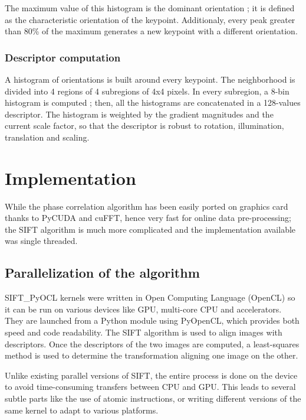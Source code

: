 \documentclass[preprint]{iucr}
\begin{document}
The maximum value of this histogram is the dominant orientation ; it is defined as the characteristic orientation of the keypoint. Additionaly, every peak greater than 80\% of the maximum generates a new keypoint with a different orientation.



\subsubsection{Descriptor computation}
A histogram of orientations is built around every keypoint. The neighborhood is divided into 4 regions of 4 subregions of 4x4 pixels. In every subregion, a 8-bin histogram is computed ; then, all the histograms are concatenated in a 128-values descriptor. The histogram is weighted by the gradient magnitudes and the current scale factor, so that the descriptor is robust to rotation, illumination, translation and scaling.

\section{Implementation}
While the phase correlation algorithm has been easily ported on graphics card
thanks to PyCUDA and cuFFT, hence very fast for online data
pre-processing;
the SIFT algorithm is much more complicated and the implementation available was
single threaded.

\subsection{Parallelization of the algorithm}
SIFT\_PyOCL kernels were written in Open Computing Language\cite{opencl} (OpenCL) so it can be run on various devices like GPU, multi-core CPU and accelerators. They are launched from a Python module using PyOpenCL\cite{pyopencl}, which provides both speed and code readability. The SIFT algorithm is used to align images with descriptors. Once the descriptors of the two images are computed, a least-squares method is used to determine the transformation aligning one image on the other.

Unlike existing parallel versions of SIFT\cite{lu,rister,vasilyev}, the entire process is done on the device to avoid time-consuming transfers between CPU and GPU. This leads to several subtle parts like the use of atomic instructions, or writing different versions of the same kernel to adapt to various platforms.
\end{document}

